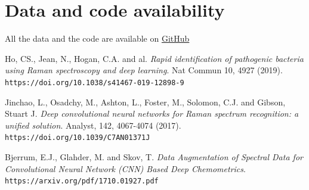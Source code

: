 \section{Data and code availability}
All the data and the code are available on \href{https://github.com/nsgln/Deep-Learning-Raman-Spectroscopy}{GitHub}

\begin{thebibliography}{9}
Ho, CS., Jean, N., Hogan, C.A. and al.
\textit{Rapid identification of pathogenic bacteria using Raman spectroscopy and deep learning}. 
Nat Commun 10, 4927 (2019).
\\\texttt{https://doi.org/10.1038/s41467-019-12898-9}

Jinchao, L., Osadchy, M., Ashton, L., Foster, M., Solomon, C.J. and Gibson, Stuart J.
\textit{Deep convolutional neural networks for Raman spectrum recognition: a unified solution}.
Analyst, 142, 4067-4074 (2017).
\\\texttt{https://doi.org/10.1039/C7AN01371J}

Bjerrum, E.J., Glahder, M. and Skov, T.
\textit{Data Augmentation of Spectral Data for Convolutional Neural Network (CNN) Based Deep Chemometrics}.
\\\texttt{https://arxiv.org/pdf/1710.01927.pdf}
\end{thebibliography}

